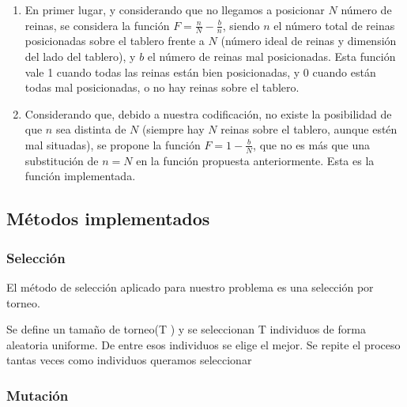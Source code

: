 \documentclass[12pt]{article}
\begin{document}
\begin{enumerate}
    \item En primer lugar, y considerando que no llegamos a posicionar $N$ número de reinas, se considera la función $F=\frac{n}{N} - \frac{b}{n}$, siendo $n$ el número total de reinas posicionadas sobre el tablero frente a $N$ (número ideal de reinas y dimensión del lado del tablero), y $b$ el número de reinas mal posicionadas. Esta función vale 1 cuando todas las reinas están bien posicionadas, y 0 cuando están todas mal posicionadas, o no hay reinas sobre el tablero.
    \item Considerando que, debido a nuestra codificación, no existe la posibilidad de que $n$ sea distinta de $N$ (siempre hay $N$ reinas sobre el tablero, aunque estén mal situadas), se propone la función $F=1-\frac{b}{N}$, que no es más que una substitución de $n=N$ en la función propuesta anteriormente. Esta es la función implementada.
\end{enumerate}

\subsection{Métodos implementados}

\subsubsection{Selección}

El método de selección aplicado para nuestro problema es una selección por torneo.



Se define un tamaño de torneo(T ) y se seleccionan T individuos de forma aleatoria uniforme.
De entre esos individuos se elige el mejor.
Se repite el proceso tantas veces como individuos queramos seleccionar

\subsubsection{Mutación}
\end{document}

